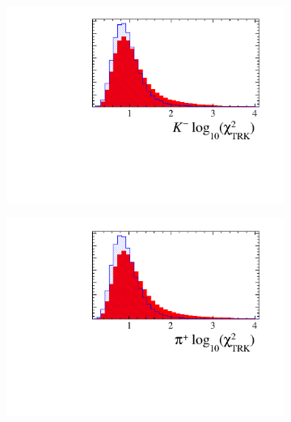 \begin{figure}[!h]
\begin{subfigure}[t]{0.22\textwidth}
   \end{subfigure}
   \begin{subfigure}[t]{0.22\textwidth}
      \centering
      \includegraphics[width=1.0\textwidth]{figs/Selection/Ds_BDT_Var_Ds2KKPi_D_K1_TRACK_CHI2NDOF.pdf}
   \end{subfigure}
   \begin{subfigure}[t]{0.22\textwidth}
      \centering
      \includegraphics[width=1.0\textwidth]{figs/Selection/Ds_BDT_Var_Ds2KKPi_D_P_TRACK_CHI2NDOF.pdf}
   \end{subfigure}
   \begin{subfigure}[t]{0.22\textwidth}
      \centering

\end{subfigure}
\end{figure}

